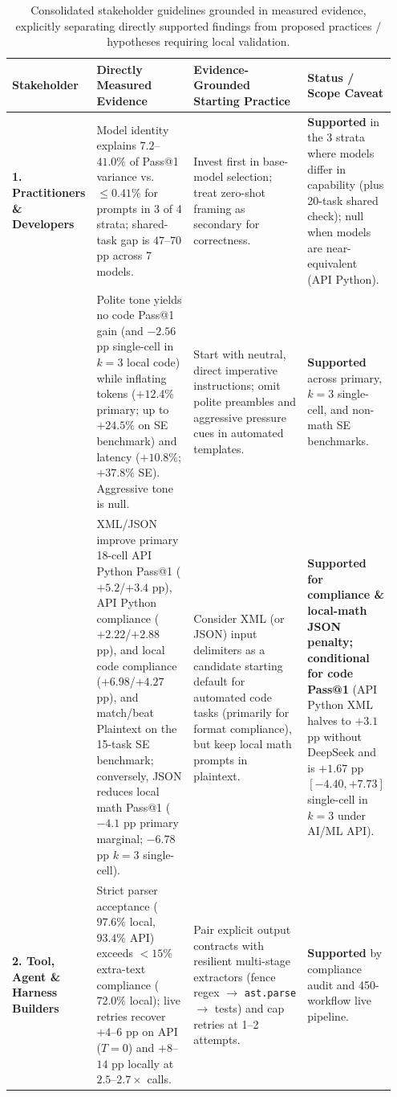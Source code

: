 \documentclass[a4paper,fleqn]{cas-sc}
\begin{document}
\begin{table}[htbp]
\centering
\caption{Consolidated stakeholder guidelines grounded in measured evidence, explicitly separating directly supported findings from proposed practices / hypotheses requiring local validation.}\label{tab:actionable-guidelines}
\footnotesize
\setlength{\tabcolsep}{3.5pt}
\begin{tabular}{@{}p{0.15\linewidth}p{0.26\linewidth}p{0.31\linewidth}p{0.23\linewidth}@{}}
\toprule
\textbf{Stakeholder} & \textbf{Directly Measured Evidence} & \textbf{Evidence-Grounded Starting Practice} & \textbf{Status / Scope Caveat} \\
\midrule
\textbf{1. Practitioners \& Developers} & Model identity explains $7.2$--$41.0\%$ of Pass@1 variance vs.\ $\le 0.41\%$ for prompts in 3 of 4 strata; shared-task gap is $47$--$70$ pp across 7 models. & Invest first in base-model selection; treat zero-shot framing as secondary for correctness. & \textbf{Supported} in the 3 strata where models differ in capability (plus 20-task shared check); null when models are near-equivalent (API Python). \\
\addlinespace[3pt]
 & Polite tone yields no code Pass@1 gain (and $-2.56$ pp single-cell in $k=3$ local code) while inflating tokens ($+12.4\%$ primary; up to $+24.5\%$ on SE benchmark) and latency ($+10.8\%$; $+37.8\%$ SE). Aggressive tone is null. & Start with neutral, direct imperative instructions; omit polite preambles and aggressive pressure cues in automated templates. & \textbf{Supported} across primary, $k=3$ single-cell, and non-math SE benchmarks. \\
\addlinespace[3pt]
 & XML/JSON improve primary 18-cell API Python Pass@1 ($+5.2$/$+3.4$ pp), API Python compliance ($+2.22$/$+2.88$ pp), and local code compliance ($+6.98$/$+4.27$ pp), and match/beat Plaintext on the 15-task SE benchmark; conversely, JSON reduces local math Pass@1 ($-4.1$ pp primary marginal; $-6.78$ pp $k=3$ single-cell). & Consider XML (or JSON) input delimiters as a candidate starting default for automated code tasks (primarily for format compliance), but keep local math prompts in plaintext. & \textbf{Supported for compliance \& local-math JSON penalty; conditional for code Pass@1} (API Python XML halves to $+3.1$ pp without DeepSeek and is $+1.67$ pp $[-4.40, +7.73]$ single-cell in $k=3$ under AI/ML API). \\
\midrule
\textbf{2. Tool, Agent \& Harness Builders} & Strict parser acceptance ($97.6\%$ local, $93.4\%$ API) exceeds $<15\%$ extra-text compliance ($72.0\%$ local); live retries recover $+4$--$6$ pp on API ($T=0$) and $+8$--$14$ pp locally at $2.5$--$2.7\times$ calls. & Pair explicit output contracts with resilient multi-stage extractors (fence regex $\to$ \texttt{ast.parse} $\to$ tests) and cap retries at 1--2 attempts. & \textbf{Supported} by compliance audit and 450-workflow live pipeline. \\

\end{tabular}
\end{table}
\end{document}
